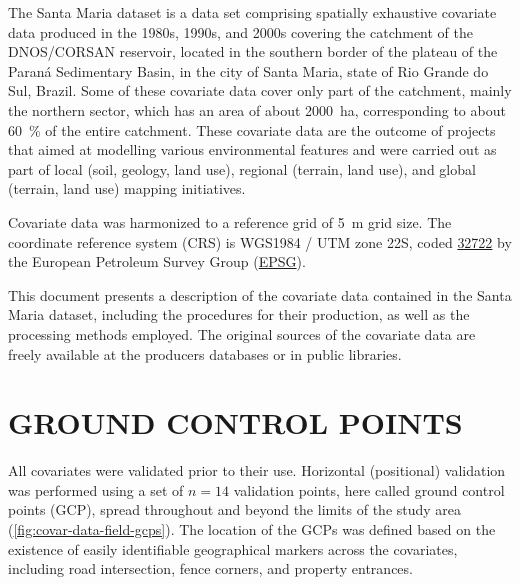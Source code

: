 The Santa Maria dataset is a data set comprising spatially exhaustive covariate data produced in the 1980s, 
1990s, and 2000s covering the catchment of the DNOS/CORSAN reservoir, located in the southern border of the 
plateau of the Paraná Sedimentary Basin, in the city of Santa Maria, state of Rio Grande do Sul, Brazil. Some 
of these covariate data cover only part of the catchment, mainly the northern sector, which has an area of 
about 
\SI{2000}{\hectare}, corresponding to about \SI{60}{\percent} of the entire catchment. These covariate data 
are the outcome of projects that aimed at modelling various environmental features and were carried out as 
part of local (soil, geology, land use), regional (terrain, land use), and global (terrain, land use) mapping 
initiatives.

Covariate data was harmonized to a reference grid of \SI{5}{\m} grid size. The coordinate reference 
system (CRS) is WGS1984 / UTM zone 22S, coded \href{http://spatialreference.org/ref/epsg/32722/}{\num{32722}} 
by the European Petroleum Survey Group (\href{http://www.epsg.org/}{EPSG}).

This document presents a description of the covariate data contained in the Santa Maria dataset, including the 
procedures for their production, as well as the processing methods employed. The original sources of the 
covariate data are freely available at the producers databases or in public libraries.

\section{GROUND CONTROL POINTS}
\label{sec:covar-data-gcp}

All covariates were validated prior to their use. Horizontal (positional) validation was performed using a set 
of $n = 14$ validation points, here called ground control points (GCP), spread throughout and beyond the 
limits of the study area (\autoref{fig:covar-data-field-gcps}). The location of the GCPs was defined based on 
the existence of easily identifiable geographical markers across the covariates, including road intersection, 
fence corners, and property entrances.

